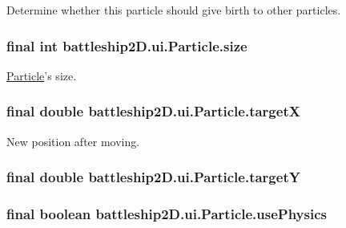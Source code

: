 Determine whether this particle should give birth to other particles. 

\hypertarget{classbattleship2D_1_1ui_1_1Particle_aeed0f277dadb5f0f4d41d7852ee8f708}{
\subsubsection[{size}]{\setlength{\rightskip}{0pt plus 5cm}final int battleship2\-D.\-ui.\-Particle.\-size\hspace{0.3cm}{\ttfamily [private]}}}\label{classbattleship2D_1_1ui_1_1Particle_aeed0f277dadb5f0f4d41d7852ee8f708}


\hyperlink{classbattleship2D_1_1ui_1_1Particle}{Particle}'s size. 

\hypertarget{classbattleship2D_1_1ui_1_1Particle_adac981aee070e317de343ce7b5967b73}{
\subsubsection[{target\-X}]{\setlength{\rightskip}{0pt plus 5cm}final double battleship2\-D.\-ui.\-Particle.\-target\-X\hspace{0.3cm}{\ttfamily [private]}}}\label{classbattleship2D_1_1ui_1_1Particle_adac981aee070e317de343ce7b5967b73}


New position after moving. 

\hypertarget{classbattleship2D_1_1ui_1_1Particle_a0c427daa62b3aa8f58077879af4e4c24}{
\subsubsection[{target\-Y}]{\setlength{\rightskip}{0pt plus 5cm}final double battleship2\-D.\-ui.\-Particle.\-target\-Y\hspace{0.3cm}{\ttfamily [package]}}}\label{classbattleship2D_1_1ui_1_1Particle_a0c427daa62b3aa8f58077879af4e4c24}
\hypertarget{classbattleship2D_1_1ui_1_1Particle_ad1d8ec268600a69b4ae2986c9b1e4ec1}{
\subsubsection[{use\-Physics}]{\setlength{\rightskip}{0pt plus 5cm}final boolean battleship2\-D.\-ui.\-Particle.\-use\-Physics\hspace{0.3cm}{\ttfamily [private]}}}\label{classbattleship2D_1_1ui_1_1Particle_ad1d8ec268600a69b4ae2986c9b1e4ec1}


